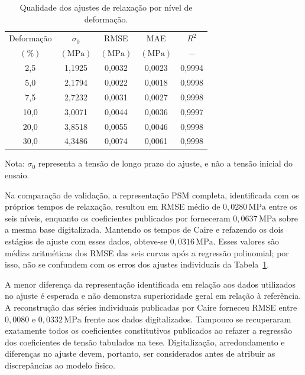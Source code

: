 \documentclass[arial,centeredequations,english,brazilian,oneside,section=TITLE]{ifes8}
\begin{document}
\begin{table}[!p]
  \caption{Qualidade dos ajustes de relaxação por nível de deformação.}
  \label{tab:qualidade-ajustes-relaxacao}
  \centering
  \begin{tabular}{ccccc}
    \hline
    Deformação & $\sigma_0$ & RMSE & MAE & $R^2$\\
    $(\%)$ & $(\mathrm{MPa})$ & $(\mathrm{MPa})$
      & $(\mathrm{MPa})$ & $-$\\
    \hline
    2,5 & 1,1925 & 0,0032 & 0,0023 & 0,9994\\
    5,0 & 2,1794 & 0,0022 & 0,0018 & 0,9998\\
    7,5 & 2,7232 & 0,0031 & 0,0027 & 0,9998\\
    10,0 & 3,0071 & 0,0044 & 0,0036 & 0,9997\\
    20,0 & 3,8518 & 0,0055 & 0,0046 & 0,9998\\
    30,0 & 4,3486 & 0,0074 & 0,0061 & 0,9998\\
    \hline
  \end{tabular}
  \smallskip
  {\small Nota: $\sigma_0$ representa a tensão de longo prazo do ajuste,
  e não a tensão inicial do ensaio.}
\end{table}

\clearpage

Na comparação de validação, a representação PSM completa, identificada
com os próprios tempos de relaxação, resultou em RMSE médio de
$0{,}0280\,\mathrm{MPa}$ entre os seis níveis, enquanto os coeficientes
publicados por  forneceram
$0{,}0637\,\mathrm{MPa}$ sobre a mesma base digitalizada. Mantendo os
tempos de Caire e refazendo os dois estágios de ajuste com esses dados,
obteve-se $0{,}0316\,\mathrm{MPa}$. Esses valores são médias aritméticas
dos RMSE das seis curvas após a regressão polinomial; por isso, não se
confundem com os erros dos ajustes individuais da
Tabela~\ref{tab:qualidade-ajustes-relaxacao}.

A menor diferença da representação identificada em relação aos dados
utilizados no ajuste é esperada e não demonstra superioridade geral em
relação à referência. A reconstrução das séries individuais publicadas
por Caire forneceu RMSE entre $0{,}0080$ e
$0{,}0332\,\mathrm{MPa}$ frente aos dados digitalizados. Tampouco se
recuperaram exatamente todos os coeficientes constitutivos publicados ao
refazer a regressão dos coeficientes de tensão tabulados na tese.
Digitalização, arredondamento e diferenças no ajuste devem, portanto,
ser considerados antes de atribuir as discrepâncias ao modelo físico.
\end{document}
